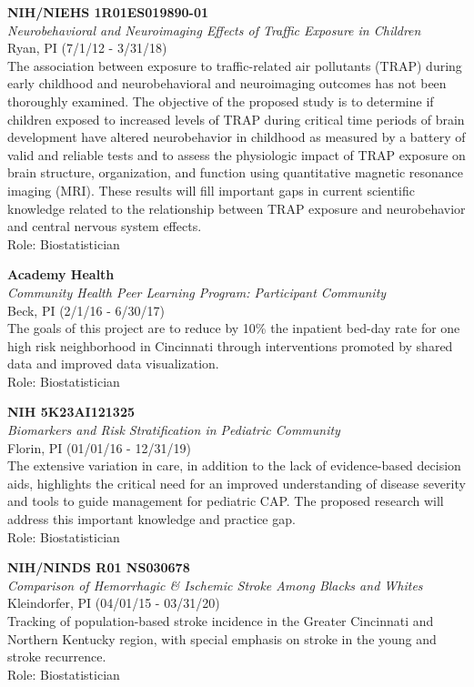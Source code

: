 \documentclass{nihbiosketch}
\begin{document}
\textbf{NIH/NIEHS 1R01ES019890-01}\\
\emph{Neurobehavioral and Neuroimaging Effects of Traffic Exposure in
	Children}\\
Ryan, PI (7/1/12 - 3/31/18)\\
The association between exposure to traffic-related air pollutants
(TRAP) during early childhood and neurobehavioral and neuroimaging
outcomes has not been thoroughly examined. The objective of the proposed
study is to determine if children exposed to increased levels of TRAP
during critical time periods of brain development have altered
neurobehavior in childhood as measured by a battery of valid and
reliable tests and to assess the physiologic impact of TRAP exposure on
brain structure, organization, and function using quantitative magnetic
resonance imaging (MRI). These results will fill important gaps in
current scientific knowledge related to the relationship between TRAP
exposure and neurobehavior and central nervous system effects.\\
Role: Biostatistician

\bigskip

\textbf{Academy Health}\\
\emph{Community Health Peer Learning Program: Participant Community}\\
Beck, PI (2/1/16 - 6/30/17)\\
The goals of this project are to reduce by 10\% the inpatient bed-day
rate for one high risk neighborhood in Cincinnati through interventions
promoted by shared data and improved data visualization.\\
Role: Biostatistician

\bigskip

\textbf{NIH 5K23AI121325}\\
\emph{Biomarkers and Risk Stratification in Pediatric Community}\\
Florin, PI (01/01/16 - 12/31/19)\\
The extensive variation in care, in addition to the lack of
evidence-based decision aids, highlights the critical need for an
improved understanding of disease severity and tools to guide management
for pediatric CAP. The proposed research will address this important
knowledge and practice gap.\\
Role: Biostatistician

\bigskip

\textbf{NIH/NINDS R01 NS030678}\\
\emph{Comparison of Hemorrhagic \& Ischemic Stroke Among Blacks and
	Whites}\\
Kleindorfer, PI (04/01/15 - 03/31/20)\\
Tracking of population-based stroke incidence in the Greater Cincinnati
and Northern Kentucky region, with special emphasis on stroke in the
young and stroke recurrence.\\
Role: Biostatistician
\end{document}
